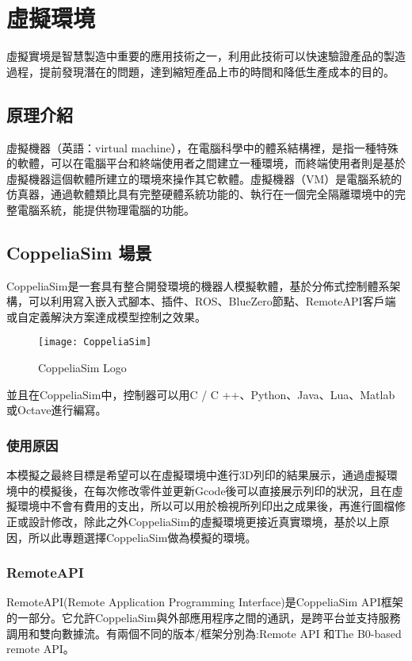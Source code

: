 \chapter{虛擬環境}

虛擬實境是智慧製造中重要的應用技術之一，利用此技術可以快速驗證產品的製造過程，提前發現潛在的問題，達到縮短產品上市的時間和降低生產成本的目的。\\

\section{原理介紹}

虛擬機器（英語：virtual machine），在電腦科學中的體系結構裡，是指一種特殊的軟體，可以在電腦平台和終端使用者之間建立一種環境，而終端使用者則是基於虛擬機器這個軟體所建立的環境來操作其它軟體。虛擬機器（VM）是電腦系統的仿真器，通過軟體類比具有完整硬體系統功能的、執行在一個完全隔離環境中的完整電腦系統，能提供物理電腦的功能。

\section{CoppeliaSim 場景}
 CoppeliaSim是一套具有整合開發環境的機器人模擬軟體，基於分佈式控制體系架構，可以利用寫入嵌入式腳本、插件、ROS、BlueZero節點、RemoteAPI客戶端或自定義解決方案達成模型控制之效果。\\
\begin{figure}[hbt!]
\center
\texttt{[image: CoppeliaSim]}
\caption{\Large CoppeliaSim Logo}
\end{figure}

並且在CoppeliaSim中，控制器可以用C / C ++、Python、Java、Lua、Matlab或Octave進行編寫。\\
\subsection{使用原因}
 本模擬之最終目標是希望可以在虛擬環境中進行3D列印的結果展示，通過虛擬環境中的模擬後，在每次修改零件並更新Gcode後可以直接展示列印的狀況，且在虛擬環境中不會有費用的支出，所以可以用於檢視所列印出之成果後，再進行圖檔修正或設計修改，除此之外CoppeliaSim的虛擬環境更接近真實環境，基於以上原因，所以此專題選擇CoppeliaSim做為模擬的環境。\\
\subsection{RemoteAPI}
 RemoteAPI(Remote Application Programming Interface)是CoppeliaSim API框架的一部分。它允許CoppeliaSim與外部應用程序之間的通訊，是跨平台並支持服務調用和雙向數據流。有兩個不同的版本/框架分別為:Remote API 和The B0-based remote API。\\
